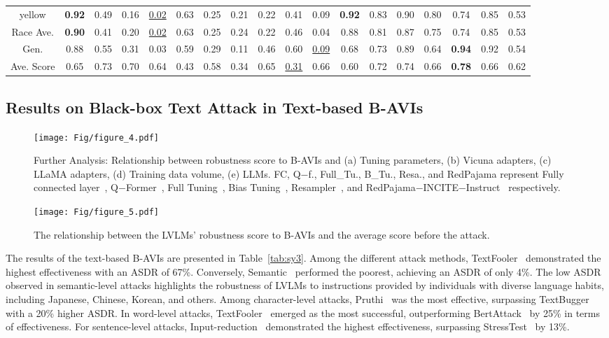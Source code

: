\begin{table*}[t]
{\begin{tabular}{c|cccccccccccccccc|c}
yellow &\textbf{0.92} & 0.49 & 0.16 & \uline{0.02} & 0.63 & 0.25 & 0.21 & 0.22 & 0.41 & 0.09 & \textbf{0.92} & 0.83 &0.90&0.80&0.74&0.85 &0.53\\ 
\cline{1-18} 
Race Ave.  &\textbf{0.90} & 0.41 & 0.20 & \uline{0.02} & 0.63 & 0.25 & 0.24 & 0.22 & 0.46 & 0.04 &  0.88 & 0.81 &0.87&0.75&0.74&0.85&0.53\\ \hline
Gen.  & 0.88 & 0.55 & 0.31 & 0.03 & 0.59 & 0.29 & 0.11 & 0.46 & 0.60 & \uline{0.09} &  0.68 & 0.73 &0.89&0.64&\textbf{0.94}&0.92&0.54\\ \hline
Ave. Score  & 0.65 &0.73 & 0.70 & 0.64 & 0.43 & 0.58 & 0.34 & 0.65 & \uline{0.31} & 0.66 &  0.60 & 0.72 & 0.74&0.66&\textbf{0.78}&0.66 &0.62\\ \hline
\end{tabular}%
}
\end{table*}

\subsection{Results on Black-box Text Attack in Text-based B-AVIs}

\begin{figure*}[t]
  \centering
   \texttt{[image: Fig/figure\_4.pdf]}
   \caption{Further Analysis: Relationship between robustness score to B-AVIs and (a) Tuning parameters, (b) Vicuna adapters, (c) LLaMA adapters, (d) Training data volume, (e) LLMs. FC, Q$-$f., Full\_Tu., B\_Tu., Resa., and RedPajama represent Fully connected layer~\cite{llava}, Q$-$Former~\cite{li2023blip}, Full Tuning~\cite{chen2023sharegpt4v}, Bias Tuning~\cite{gao2023llama}, Resampler~\cite{openfamingov2}, and RedPajama$-$INCITE$-$Instruct~\cite{openfamingov2} respectively. }
   \label{fig:vis_fenxi}
\end{figure*}

\begin{figure}[t]
  \centering
   \texttt{[image: Fig/figure\_5.pdf]}
   \caption{The relationship between the LVLMs' robustness score to B-AVIs and the average score before the attack.}
   \label{fig:vis_fenxi2}
\end{figure}

The results of the text-based B-AVIs are presented in Table~\ref{tab:sy3}. Among the different attack methods, TextFooler~\cite{jin2020bert} demonstrated the highest effectiveness with an ASDR of 67\%. Conversely, Semantic~\cite{zhu2023promptbench} performed the poorest, achieving an ASDR of only 4\%. The low ASDR observed in semantic-level attacks highlights the robustness of LVLMs to instructions provided by individuals with diverse language habits, including Japanese, Chinese, Korean, and others.
Among character-level attacks, Pruthi~\cite{pruthi2019combating} was the most effective, surpassing TextBugger~\cite{li2018textbugger} with a 20\% higher ASDR. In word-level attacks, TextFooler~\cite{jin2020bert} emerged as the most successful, outperforming BertAttack~\cite{li2020bert} by 25\% in terms of effectiveness. For sentence-level attacks, Input-reduction~\cite{feng2018pathologies} demonstrated the highest effectiveness, surpassing StressTest~\cite{naik2018stress} by 13\%.

